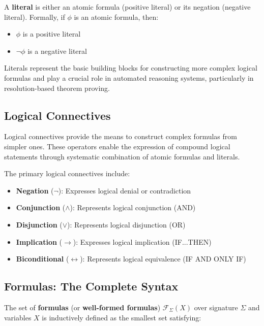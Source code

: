 \documentclass[11pt,a4paper]{article}
\theoremstyle{definition}
\theoremstyle{plain}
\theoremstyle{remark}
\begin{document}
A \textbf{literal} is either an atomic formula (positive literal) or its negation (negative literal). Formally, if $\phi$ is an atomic formula, then:
\begin{itemize}
    \item $\phi$ is a positive literal
    \item $\neg \phi$ is a negative literal
\end{itemize}

Literals represent the basic building blocks for constructing more complex logical formulas and play a crucial role in automated reasoning systems, particularly in resolution-based theorem proving.

\subsection{Logical Connectives}

Logical connectives provide the means to construct complex formulas from simpler ones. These operators enable the expression of compound logical statements through systematic combination of atomic formulas and literals.

The primary logical connectives include:
\begin{itemize}
    \item \textbf{Negation} ($\neg$): Expresses logical denial or contradiction
    \item \textbf{Conjunction} ($\wedge$): Represents logical conjunction (AND)
    \item \textbf{Disjunction} ($\vee$): Represents logical disjunction (OR)
    \item \textbf{Implication} ($\rightarrow$): Expresses logical implication (IF...THEN)
    \item \textbf{Biconditional} ($\leftrightarrow$): Represents logical equivalence (IF AND ONLY IF)
\end{itemize}

\subsection{Formulas: The Complete Syntax}

The set of \textbf{formulas} (or \textbf{well-formed formulas}) $\mathcal{F}_\Sigma(X)$ over signature $\Sigma$ and variables $X$ is inductively defined as the smallest set satisfying:
\end{document}
